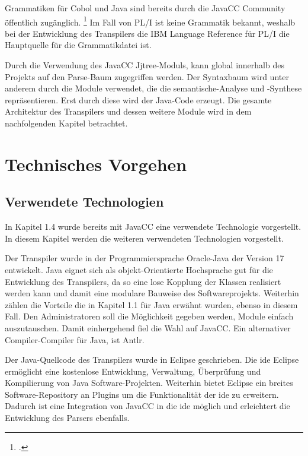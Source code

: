  
Grammatiken für Cobol und Java sind bereits durch die JavaCC Community öffentlich zugänglich. \footcite[Vgl. ][]{javaccdoku}
Im Fall von PL/I ist keine Grammatik bekannt, weshalb bei der Entwicklung des Transpilers die IBM Language Reference für PL/I die Hauptquelle für die Grammatikdatei ist.   

Durch die Verwendung des JavaCC Jjtree-Moduls, kann global innerhalb des Projekts auf den Parse-Baum zugegriffen werden. 
Der Syntaxbaum wird unter anderem durch die Module verwendet, die die semantische-Analyse und -Synthese repräsentieren.
Erst durch diese wird der Java-Code erzeugt.
Die gesamte Architektur des Transpilers und dessen weitere Module wird in dem nachfolgenden Kapitel betrachtet. 

\section{Technisches Vorgehen}
\subsection{Verwendete Technologien}
In Kapitel 1.4 wurde bereits mit JavaCC eine verwendete Technologie vorgestellt. In diesem Kapitel werden die weiteren verwendeten Technologien vorgestellt.

Der Transpiler wurde in der Programmiersprache Oracle-Java der Version 17 entwickelt. 
Java eignet sich als objekt-Orientierte Hochsprache gut für die Entwicklung des Transpilers, da so eine lose Kopplung der Klassen realisiert werden kann und damit eine modulare Bauweise des Softwareprojekts.
Weiterhin zählen die Vorteile die in Kapitel 1.1 für Java erwähnt wurden, ebenso in diesem Fall. Den Administratoren soll die Möglichkeit gegeben werden, Module einfach auszutauschen. 
Damit einhergehend fiel die Wahl auf JavaCC. Ein alternativer Compiler-Compiler für Java, ist Antlr. 

Der Java-Quellcode des Transpilers wurde in Eclipse geschrieben. Die \ac{ide} Eclipse ermöglicht eine kostenlose Entwicklung, Verwaltung, Überprüfung und Kompilierung von Java Software-Projekten. Weiterhin bietet Eclipse ein breites Software-Repository an Plugins um die Funktionalität der  \ac{ide} zu erweitern. Dadurch ist eine Integration von JavaCC in die  \ac{ide} möglich und erleichtert die Entwicklung des Parsers ebenfalls.

